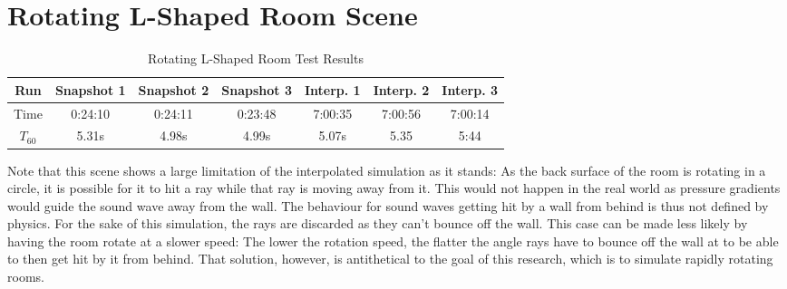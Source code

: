 \section{Rotating L-Shaped Room Scene}

\begin{table}[t!]\label{tbl:LScene}
\centering
    \begin{tabular}{| c | c | c | c | c | c | c |}
        \hline
        Run & Snapshot 1 & Snapshot 2 & Snapshot 3 & Interp. 1 & Interp. 2 & Interp. 3 \\
        \hline
        Time & 0:24:10 & 0:24:11 & 0:23:48 & 7:00:35 & 7:00:56 & 7:00:14 \\
        \hline
        \(T_{60}\) & 5.31s & 4.98s & 4.99s & 5.07s & 5.35 & 5:44 \\
        \hline
    \end{tabular}
    \caption{Rotating L-Shaped Room Test Results}
\end{table}

Note that this scene shows a large limitation of the interpolated simulation as it stands:
As the back surface of the room is rotating in a circle,
it is possible for it to hit a ray while that ray is moving away from it.
This would not happen in the real world as pressure gradients would guide the sound wave away from the wall.
\newline
The behaviour for sound waves getting hit by a wall from behind is thus not defined by physics.
For the sake of this simulation, the rays are discarded as they can't bounce off the wall.
This case can be made less likely by having the room rotate at a slower speed:
The lower the rotation speed, the flatter the angle rays have to bounce off the wall at to be able to then get hit by it from behind.
That solution, however, is antithetical to the goal of this research, which is to simulate rapidly rotating rooms.
